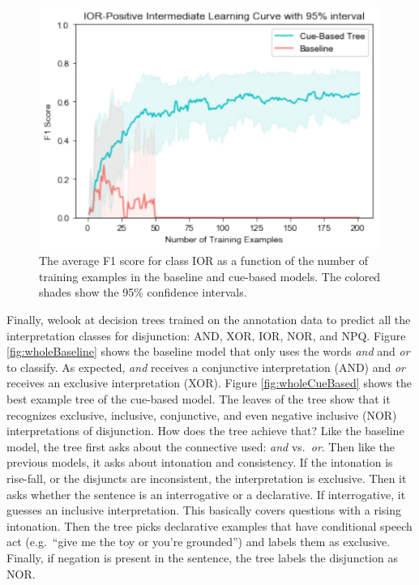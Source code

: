 \documentclass[,man,floatsintext]{apa6}
\begin{document}
\begin{figure}
\centering
\includegraphics{figs/IORintermediate-1.pdf}
\caption{\label{fig:IORintermediate}The average F1 score for class IOR as a function of the number of training examples in the baseline and cue-based models. The colored shades show the 95\% confidence intervals.}
\end{figure}

Finally, welook at decision trees trained on the annotation data to predict all the interpretation classes for disjunction: AND, XOR, IOR, NOR, and NPQ. Figure \ref{fig:wholeBaseline} shows the baseline model that only uses the words \emph{and} and \emph{or} to classify. As expected, \emph{and} receives a conjunctive interpretation (AND) and \emph{or} receives an exclusive interpretation (XOR). Figure \ref{fig:wholeCueBased} shows the best example tree of the cue-based model. The leaves of the tree show that it recognizes exclusive, inclusive, conjunctive, and even negative inclusive (NOR) interpretations of disjunction. How does the tree achieve that? Like the baseline model, the tree first asks about the connective used: \emph{and} vs.~\emph{or}. Then like the previous models, it asks about intonation and consistency. If the intonation is rise-fall, or the disjuncts are inconsistent, the interpretation is exclusive. Then it asks whether the sentence is an interrogative or a declarative. If interrogative, it guesses an inclusive interpretation. This basically covers questions with a rising intonation. Then the tree picks declarative examples that have conditional speech act (e.g.~\enquote{give me the toy or you're grounded}) and labels them as exclusive. Finally, if negation is present in the sentence, the tree labels the disjunction as NOR.
\end{document}
